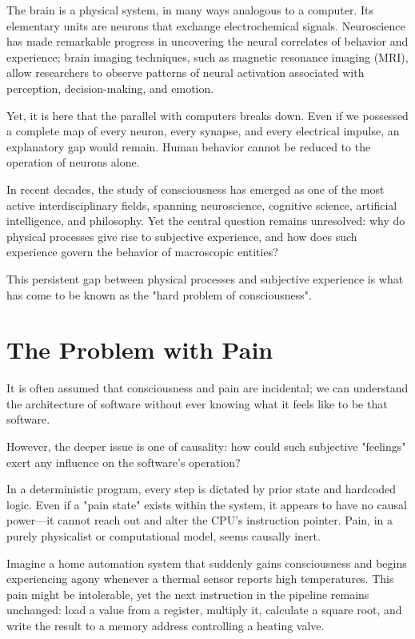 The brain is a physical system, in many ways analogous to a computer.
Its elementary units are neurons that exchange electrochemical signals.
Neuroscience has made remarkable progress in uncovering the neural correlates of behavior and experience; brain imaging techniques, such as magnetic resonance imaging (MRI), allow researchers to observe patterns of neural activation associated with perception, decision-making, and emotion.

Yet, it is here that the parallel with computers breaks down.
Even if we possessed a complete map of every neuron, every synapse, and every electrical impulse, an explanatory gap would remain.
Human behavior cannot be reduced to the operation of neurons alone.

In recent decades, the study of consciousness has emerged as one of the most active interdisciplinary fields, spanning neuroscience, cognitive science, artificial intelligence, and philosophy.
Yet the central question remains unresolved: why do physical processes give rise to subjective experience, and how does such experience govern the behavior of macroscopic entities?

This persistent gap between physical processes and subjective experience is what has come to be known as the "hard problem of consciousness".


\section{The Problem with Pain}

It is often assumed that consciousness and pain are incidental; we can understand the architecture of software without ever knowing what it feels like to be that software.

However, the deeper issue is one of causality: how could such subjective "feelings" exert any influence on the software’s operation?

In a deterministic program, every step is dictated by prior state and hardcoded logic. Even if a "pain state" exists within the system, it appears to have no causal power—it cannot reach out and alter the CPU's instruction pointer. Pain, in a purely physicalist or computational model, seems causally inert.

Imagine a home automation system that suddenly gains consciousness and begins experiencing agony whenever a thermal sensor reports high temperatures. This pain might be intolerable, yet the next instruction in the pipeline remains unchanged: load a value from a register, multiply it, calculate a square root, and write the result to a memory address controlling a heating valve.

